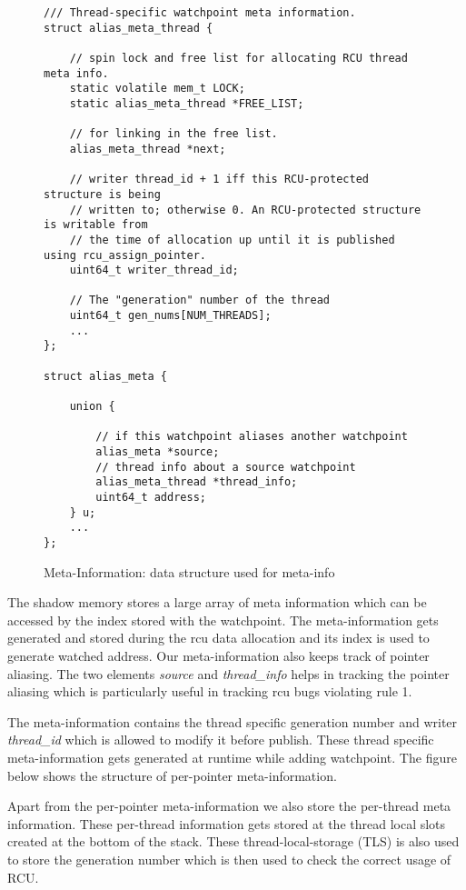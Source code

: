 \begin{figure}[h]
\centering
\begin{lstlisting}
/// Thread-specific watchpoint meta information.
struct alias_meta_thread {

    // spin lock and free list for allocating RCU thread meta info.
    static volatile mem_t LOCK;
    static alias_meta_thread *FREE_LIST;

    // for linking in the free list.
    alias_meta_thread *next;

    // writer thread_id + 1 iff this RCU-protected structure is being
    // written to; otherwise 0. An RCU-protected structure is writable from
    // the time of allocation up until it is published using rcu_assign_pointer.
    uint64_t writer_thread_id;

    // The "generation" number of the thread
    uint64_t gen_nums[NUM_THREADS];
    ...
};

struct alias_meta {

    union {

        // if this watchpoint aliases another watchpoint
        alias_meta *source;
        // thread info about a source watchpoint
        alias_meta_thread *thread_info;
        uint64_t address;
    } u;
    ...
}; 
\end{lstlisting}
\caption{Meta-Information: data structure used for meta-info}\label{fig:metainfo}
\end{figure}

The shadow memory stores a large array of meta information which can be accessed by the index stored with the watchpoint. The meta-information gets generated and stored during the rcu data allocation and its index is used to generate watched address. Our meta-information also keeps track of pointer aliasing. The two elements \emph{source} and \emph{thread\_info} helps in tracking the pointer aliasing which is particularly useful in tracking rcu bugs violating rule 1.

The meta-information contains the thread specific generation number and writer \emph{thread\_id} which is allowed to modify it before publish. These thread specific meta-information gets generated at runtime while adding watchpoint. The figure below shows the structure of per-pointer meta-information.

Apart from the per-pointer meta-information we also store the per-thread meta information. These per-thread information gets stored at the thread local slots created at the bottom of the stack. These thread-local-storage (TLS) is also used to store the generation number which is then used to check the correct usage of RCU.

